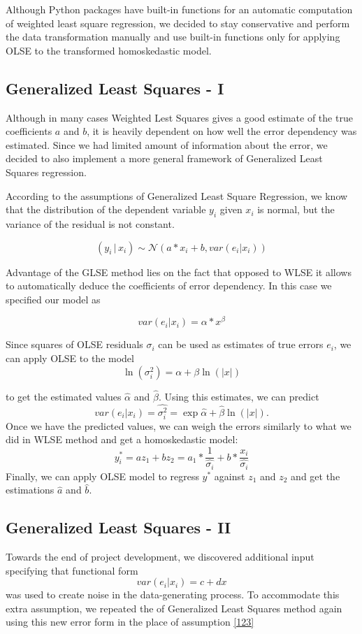 \documentclass[letter,12pt]{article} %
\begin{document}
	Although Python packages have built-in functions for an automatic computation of weighted least square regression, we decided to stay conservative and perform the data transformation manually and use built-in functions only for applying OLSE to the transformed homoskedastic model.
	
	\subsection*{Generalized Least Squares - I}
	Although in many cases Weighted Lest Squares gives a good estimate of the true coefficients $a$ and $b$, it is heavily dependent on how well the error dependency was estimated. Since we had limited amount of information about the error, we decided to also implement a more general framework of Generalized Least Squares regression.
	
	According to the assumptions of Generalized Least Square Regression, we know that the distribution of the dependent variable $y_i$ given $x_i$ is normal, but the variance of the residual is not constant.
	
	$$(y_i \, | \, x_i) \sim \mathcal{N}(a*x_i + b, var(e_i | x_i))$$
	
	Advantage of the GLSE method lies on the fact that opposed to WLSE it allows to automatically deduce the coefficients of error dependency. In this case we specified our model as
	
	\begin{equation} \tag{$\star$} \label{123}
	var(e_i | x_i) = \alpha*x^{\beta}
	\end{equation}
	
	Since squares of OLSE residuals $\sigma_i$ can be used as estimates of true errors $e_i$, we can apply OLSE to the model
	$$
	\ln(\sigma^2_i) = \alpha + \beta \ln(|x|)
	$$
	
	to get the estimated values $\hat{\alpha}$ and $\hat{\beta}$. Using this estimates, we can predict 
	$$
	var(e_i | x_i) = \hat{\sigma^2_i} = \exp{\hat{\alpha} + \hat{\beta} \ln(|x|)}.
	$$
	Once we have the predicted values, we can weigh the errors similarly to what we did in  WLSE method and get a homoskedastic model:
	$$
	y_i^* = a z_1 + bz_2 = a_1 * \frac{1}{\hat{\sigma_i}} + b  * \frac{x_i}{\hat{\sigma_i}}
	$$
	Finally, we can apply OLSE model to regress $y^*$ against $z_1$ and $z_2$ and get the 
	estimations $\hat{a}$ and $\hat{b}$.
	
	\subsection*{Generalized Least Squares - II}
	Towards the end of project development, we discovered additional input specifying that functional form 
	$$
	var(e_i | x_i) = c + dx
	$$
	was used to create noise in the data-generating process. To accommodate this extra assumption, we repeated the of Generalized Least Squares method again using this new error form in  the place of assumption \eqref{123}
	
\end{document}
